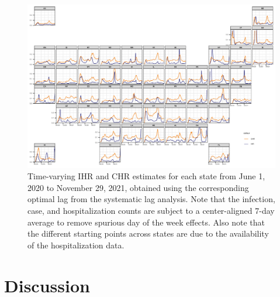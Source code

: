 \documentclass{article}
\newcommand{\attn }[1]{\textcolor{red}{ATTN: #1}}
\begin{document}
\begin{figure}[!tb]
\centering
\includegraphics[width=.99\linewidth]{IHR_7dav_F24.pdf}
\caption{Time-varying IHR and CHR estimates for each state from June 1, 2020
to November 29, 2021, obtained using the corresponding optimal lag from the
systematic lag analysis. Note that the infection, case, and hospitalization
counts are subject to a center-aligned 7-day average to remove spurious day
of the week effects. Also note that the different starting points across
states are due to the availability of the hospitalization data.}
\label{fig:IHR_7dav}
\end{figure}



\section{Discussion}
\end{document}
